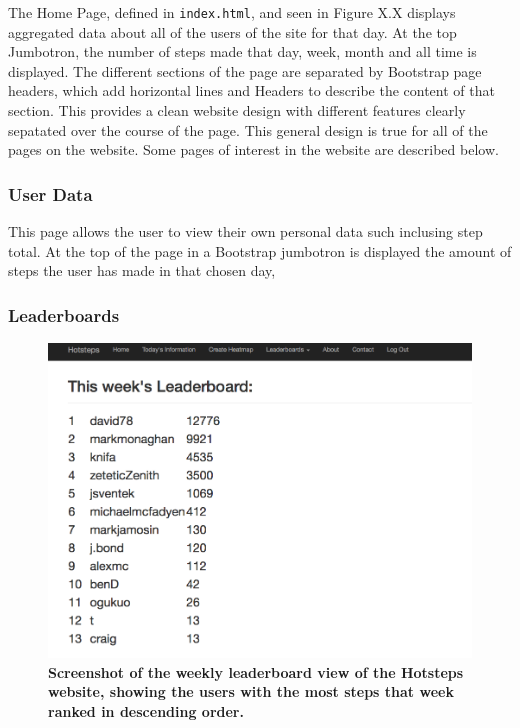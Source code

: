 \documentclass{l4proj}
\begin{document}
The Home Page, defined in \texttt{index.html}, and seen in Figure X.X displays aggregated data about all of the users of the site for that day. At the top Jumbotron, the number of steps made that day, week, month and all time is displayed. The different sections of the page are separated by Bootstrap page headers, which add horizontal lines and Headers to describe the content of that section. This provides a clean website design with different features clearly sepatated over the course of the page. This general design is true for all of the pages on the website. Some pages of interest in the website are described below.

\subsubsection{User Data}

This page allows the user to view their own personal data such inclusing step total.  At the top of the page in a Bootstrap jumbotron is displayed the amount of steps the user has made in that chosen day, 

\subsubsection{Leaderboards}

\begin{figure}[ht!]
\centering
\includegraphics[scale=0.4]{images/screenshots/leaderboardscreen.png}
\caption{\textbf{Screenshot of the weekly leaderboard view of the Hotsteps website, showing the users with the most steps that week ranked in descending order.}}
\label{impl:leaderboardsscreen}
\end{figure}
\end{document}
